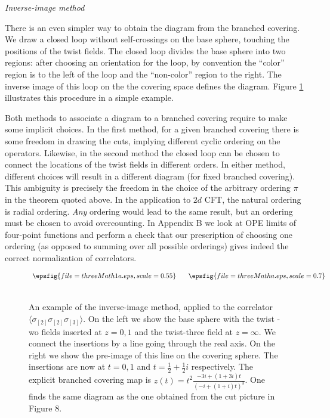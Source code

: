 \documentclass[letterpaper]{JHEP3}
\def\s{\sigma}
\def\half{{\frac12}}
\begin{document}
\medskip


{\noindent \it  Inverse-image method }

\medskip

There is an even  simpler way to obtain the diagram from the branched covering.
We draw a closed loop without self-crossings on the base sphere, touching the positions of the twist fields. 
The closed loop divides the base sphere into two regions: after choosing an orientation for the loop, by convention
the ``color'' region is to the left  of the loop and  the ``non-color'' region to the right.  
The inverse image of this loop on the the covering space  defines the diagram.   
Figure \ref{math3} illustrates this procedure in a simple example.

Both methods to associate a diagram to a branched covering require to make some implicit choices.  In the first method, for a given branched covering there is some freedom in drawing the cuts,
implying different cyclic ordering on the operators. Likewise, in the second method the closed loop can be chosen to connect the locations of the twist fields in different orders.
In either method, different choices will result in a different diagram (for fixed branched covering).
This ambiguity is precisely the freedom in the choice of the arbitrary ordering $\pi$ in the theorem quoted above. In the application
to  $2d$ CFT, the natural ordering is radial ordering. {\it Any} ordering would lead to the same result, but
an ordering must be chosen to avoid overcounting. In Appendix B we  look at OPE limits of four-point functions and perform a check 
that our prescription of choosing one ordering (as opposed to summing over all possible orderings) gives indeed the correct normalization of correlators.
\begin{figure}[htbp]
\begin{center}
$\begin{array}{c@{\hspace{0.25in}}c}
  \epsfig{file=threeMath1a.eps,scale=0.55}& \epsfig{file=threeMatha.eps,scale=0.7}  \\
\\ [0.2cm]
\end{array}$
\end{center}
  \caption{An example of the inverse-image method, applied to the correlator $\langle\s_{[2]}\s_{[2]}\s_{[3]}\rangle$.
On the left we show the base sphere with the twist -wo fields inserted at $z=0,1$ and the twist-three field at $z=\infty$. We connect the insertions
by a line going through the real axis. On the right we show the pre-image of this line on the covering sphere. The insertions are
now at $t=0,1$ and $t=\half+\half i$ respectively. The explicit branched covering map  is 
$z(t)=t^2 \frac{-3 i+(1 +3 i) t}{(-i+(1+i)t)^3}$. One finds  the same diagram as the one obtained from
the cut picture in Figure 8.} \label{math3}
\end{figure}
\end{document}
